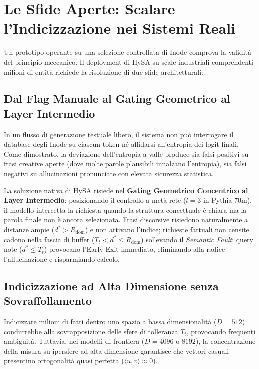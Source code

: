 \documentclass[11pt,a4paper]{article}
\theoremstyle{definition}
\begin{document}
\section{Le Sfide Aperte: Scalare l'Indicizzazione nei Sistemi Reali}

Un prototipo operante su una selezione controllata di Inode comprova la validità del principio meccanico. Il deployment di HySA su scale industriali comprendenti milioni di entità richiede la risoluzione di due sfide architetturali:

\subsection{Dal Flag Manuale al Gating Geometrico al Layer Intermedio}

In un flusso di generazione testuale libero, il sistema non può interrogare il database degli Inode su ciascun token né affidarsi all'entropia dei logit finali. Come dimostrato, la deviazione dell'entropia a valle produce sia falsi positivi su frasi creative aperte (dove molte parole plausibili innalzano l'entropia), sia falsi negativi su allucinazioni pronunciate con elevata sicurezza statistica.

La soluzione nativa di HySA risiede nel \textbf{Gating Geometrico Concentrico al Layer Intermedio}: posizionando il controllo a metà rete ($l=3$ in Pythia-70m), il modello intercetta la richiesta quando la struttura concettuale è chiara ma la parola finale non è ancora selezionata. Frasi discorsive risiedono naturalmente a distanze ampie ($d^* > R_{\mathrm{dom}}$) e non attivano l'indice; richieste fattuali non censite cadono nella fascia di buffer ($T_t < d^* \le R_{\mathrm{dom}}$) sollevando il \textit{Semantic Fault}; query note ($d^* \le T_t$) provocano l'Early-Exit immediato, eliminando alla radice l'allucinazione e risparmiando calcolo.

\subsection{Indicizzazione ad Alta Dimensione senza Sovraffollamento}

Indicizzare milioni di fatti dentro uno spazio a bassa dimensionalità ($D=512$) condurrebbe alla sovrapposizione delle sfere di tolleranza $T_t$, provocando frequenti ambiguità. Tuttavia, nei modelli di frontiera ($D = 4096$ o $8192$), la concentrazione della misura su ipersfere ad alta dimensione garantisce che vettori casuali presentino ortogonalità quasi perfetta ($\langle u, v \rangle \approx 0$). 
\end{document}
